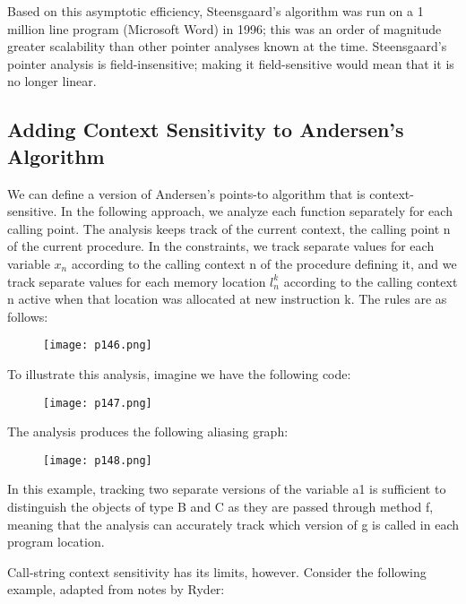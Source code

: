 Based on this asymptotic efficiency, Steensgaard’s algorithm was run on a 1 million line program (Microsoft Word) in 1996; this was an order of magnitude greater scalability than other
pointer analyses known at the time.
Steensgaard’s pointer analysis is field-insensitive; making it field-sensitive would mean that it
is no longer linear.


\subsection{Adding Context Sensitivity to Andersen’s Algorithm}

We can define a version of Andersen’s points-to algorithm that is context-sensitive. In the following approach, we analyze each function separately for each calling point. The analysis keeps track
of the current context, the calling point n of the current procedure. In the constraints, we track
separate values for each variable $x_n$ according to the calling context n of the procedure defining it,
and we track separate values for each memory location $l_n^k$ according to the calling context n active
when that location was allocated at new instruction k. The rules are as follows:


\begin{figure}[H]
	\centering
	\texttt{[image: p146.png]}
	\caption{}
	\label{fig:p146}
\end{figure}


To illustrate this analysis, imagine we have the following code:

\begin{figure}[H]
	\centering
	\texttt{[image: p147.png]}
	\caption{}
	\label{fig:p147}
\end{figure}

The analysis produces the following aliasing graph:


\begin{figure}[H]
	\centering
	\texttt{[image: p148.png]}
	\caption{}
	\label{fig:p148}
\end{figure}


In this example, tracking two separate versions of the variable a1 is sufficient to distinguish
the objects of type B and C as they are passed through method f, meaning that the analysis can
accurately track which version of g is called in each program location.

Call-string context sensitivity has its limits, however. Consider the following example,
adapted from notes by Ryder:


